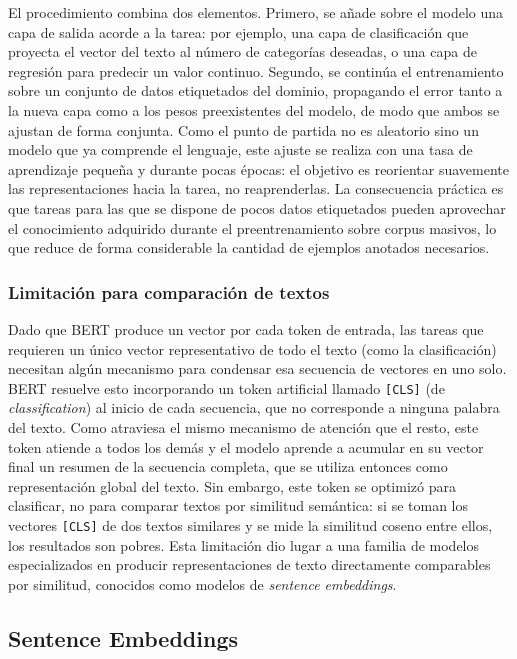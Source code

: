 El procedimiento combina dos elementos. Primero, se añade sobre el modelo una capa de salida acorde a la tarea: por ejemplo, una capa de clasificación que proyecta el vector del texto al número de categorías deseadas, o una capa de regresión para predecir un valor continuo. Segundo, se continúa el entrenamiento sobre un conjunto de datos etiquetados del dominio, propagando el error tanto a la nueva capa como a los pesos preexistentes del modelo, de modo que ambos se ajustan de forma conjunta. Como el punto de partida no es aleatorio sino un modelo que ya comprende el lenguaje, este ajuste se realiza con una tasa de aprendizaje pequeña y durante pocas épocas: el objetivo es reorientar suavemente las representaciones hacia la tarea, no reaprenderlas. La consecuencia práctica es que tareas para las que se dispone de pocos datos etiquetados pueden aprovechar el conocimiento adquirido durante el preentrenamiento sobre corpus masivos, lo que reduce de forma considerable la cantidad de ejemplos anotados necesarios.

\subsubsection*{Limitación para comparación de textos}

Dado que BERT produce un vector por cada token de entrada, las tareas que requieren un único vector representativo de todo el texto (como la clasificación) necesitan algún mecanismo para condensar esa secuencia de vectores en uno solo. BERT resuelve esto incorporando un token artificial llamado \texttt{[CLS]} (de \textit{classification}) al inicio de cada secuencia, que no corresponde a ninguna palabra del texto. Como atraviesa el mismo mecanismo de atención que el resto, este token atiende a todos los demás y el modelo aprende a acumular en su vector final un resumen de la secuencia completa, que se utiliza entonces como representación global del texto. Sin embargo, este token se optimizó para clasificar, no para comparar textos por similitud semántica: si se toman los vectores \texttt{[CLS]} de dos textos similares y se mide la similitud coseno entre ellos, los resultados son pobres. Esta limitación dio lugar a una familia de modelos especializados en producir representaciones de texto directamente comparables por similitud, conocidos como modelos de \textit{sentence embeddings}.

\subsection{Sentence Embeddings}
\label{subsec:sentence-embeddings}

